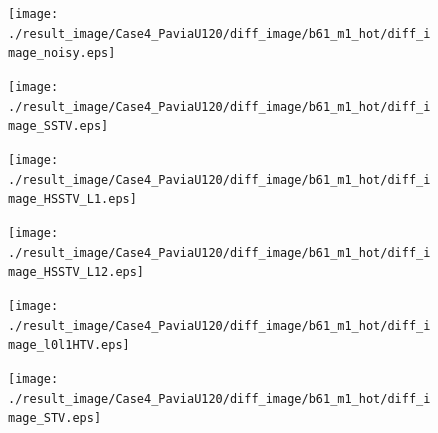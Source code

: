 \begin{figure}[t]
\begin{center}
		\begin{minipage}{0.125\hsize}
			\centerline{\hspace{\hsize}} %
		\end{minipage}
		\begin{minipage}{0.125\hsize}
			\centerline{\texttt{[image: ./result\_image/Case4\_PaviaU120/diff\_image/b61\_m1\_hot/diff\_image\_noisy.eps]}} %
		\end{minipage}
		\begin{minipage}{0.125\hsize}
			\centerline{\texttt{[image: ./result\_image/Case4\_PaviaU120/diff\_image/b61\_m1\_hot/diff\_image\_SSTV.eps]}} %
		\end{minipage}
		\begin{minipage}{0.125\hsize}
			\centerline{\texttt{[image: ./result\_image/Case4\_PaviaU120/diff\_image/b61\_m1\_hot/diff\_image\_HSSTV\_L1.eps]}} %
		\end{minipage}
		\begin{minipage}{0.125\hsize}
			\centerline{\texttt{[image: ./result\_image/Case4\_PaviaU120/diff\_image/b61\_m1\_hot/diff\_image\_HSSTV\_L12.eps]}} %
		\end{minipage}
		\begin{minipage}{0.125\hsize}
			\centerline{\texttt{[image: ./result\_image/Case4\_PaviaU120/diff\_image/b61\_m1\_hot/diff\_image\_l0l1HTV.eps]}} %
		\end{minipage}
		\begin{minipage}{0.125\hsize}
			\centerline{\texttt{[image: ./result\_image/Case4\_PaviaU120/diff\_image/b61\_m1\_hot/diff\_image\_STV.eps]}} %
		\end{minipage}
		\begin{minipage}{0.050\hsize}

\end{minipage}
\end{center}
\end{figure}
